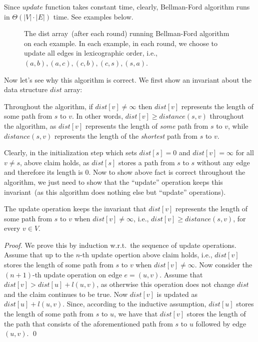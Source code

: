 Since $update$ function takes constant time, clearly, Bellman-Ford algorithm runs in $\Theta(|V| \cdot |E|)$ time.
See examples below.

\begin{figure}[h]
\centering{}
\caption{The dist array~(after each round) running Bellman-Ford algorithm on each example.
In each example, in each round, we choose to update all edges in lexicographic order, i.e., $(a,b), (a,c), (c,b),(c,s),(s,a)$.}
\end{figure}


Now let's see why this algorithm is correct. We first show an invariant about the data structure $dist$ array: 

\begin{fact}
\label{fact1}
Throughout the algorithm, if $dist[v] \neq \infty$ then $dist[v]$ represents the length of some path from $s$ to $v$.
In other words, $dist[v] \ge distance(s,v)$ throughout the algorithm, as $dist[v]$ 
represents the length of \emph{some} path from $s$ to $v$, while $distance(s,v)$ represents the
length of the \emph{shortest} path from $s$ to $v$.
\end{fact}

Clearly, in the initialization step which sets $dist[s] = 0$ and $dist[v] = \infty$ for all $v\neq s$, above claim holds,
as $dist[s]$ stores a path from $s$ to $s$ without any edge and therefore its length is 0.
Now to show above fact is correct throughout the algorithm, we just need to show that the ``update'' operation keeps
this invariant~(as this algorithm does nothing else but ``update'' operations).

\begin{fact}
\label{fact2}
The update operation keeps the invariant that $dist[v]$ represents the length of some path from $s$ to $v$ when $dist[v] \neq \infty$, i.e., $dist[v] \ge distance(s,v)$, for every $v\in V$.
\end{fact}
\emph{Proof.} We prove this by induction w.r.t.\ the sequence of update operations. Assume that up to the $n$-th update opertion
above claim holds, i.e., $dist[v]$ stores the length of some path from $s$ to $v$ when $dist[v] \neq \infty$.
Now consider the $(n+1)$-th update operation on edge $e = (u,v)$. Assume that $dist[v] > dist[u] + l(u,v)$, as otherwise this operation does not change $dist$ 
and the claim continues to be true.
Now $dist[v]$ is updated as $dist[u] + l(u,v)$. Since, according to the inductive assumption, $dist[u]$ stores the length of some path from $s$ to $u$,
we have that $dist[v]$ stores the length of the path that consists of the aforementioned path from $s$ to $u$ followed by edge $(u,v)$. \qed


